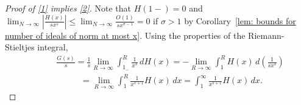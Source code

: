 \documentclass[11pt]{amsart}
\theoremstyle{definition}
\newcommand{\NN}{{\mathcal N}}
\newcommand{\mf}{\mathfrak}
\begin{document}
  \begin{proof}[Proof of \eqref{1} implies \eqref{2}] 
 Note that $H(1-)=0$ and 
    $\lim_{N\to\infty}\left| \frac{H(x)}{sx^{s}}\right|\leq \lim_{N\to\infty}\frac{O(1)}{sx^{\sigma-1}}=0$ if $\sigma>1$ by Corollary~\ref{lem: bounds for number of ideals of norm at most x}.    
    Using the properties of the Riemann-Stieltjes integral,
    \begin{equation}\label{early}
    \begin{split}
    &\qquad \frac{G(s)}{s}=\frac{1}{s}\lim_{R\to\infty}\int_{1_-}^R\frac{1}{x^{s}}\,dH(x)=-\lim_{R\to\infty}\int_{1}^R H(x)\,d\left(\frac{1}{sx^{s}}\right)
    \\&\qquad\;\;\;\quad\quad=\lim_{R\to\infty}\int_1^R\frac{1}{x^{s+1}}H(x)\,dx = \int_1^{\infty} \frac{1}{x^{s+1}}H(x)\,dx.
    \end{split}
 \end{equation}
   

\end{proof}
\end{document}
